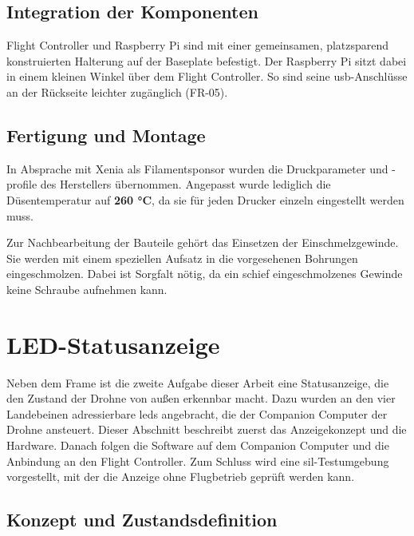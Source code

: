         \subsection{Integration der Komponenten}
        \label{sec:Frame_Integration}

        Flight Controller und Raspberry Pi sind mit einer gemeinsamen, platzsparend konstruierten Halterung auf der Baseplate befestigt. Der Raspberry Pi sitzt dabei in einem kleinen Winkel über dem Flight Controller. So sind seine \gls{usb}-Anschlüsse an der Rückseite leichter zugänglich (FR-05). %

        \subsection{Fertigung und Montage}
        \label{sec:Frame_Fertigung}

        In Absprache mit Xenia als Filamentsponsor wurden die Druckparameter und -profile des Herstellers übernommen. Angepasst wurde lediglich die Düsentemperatur auf \textbf{260 °C}, da sie für jeden Drucker einzeln eingestellt werden muss.

        Zur Nachbearbeitung der Bauteile gehört das Einsetzen der Einschmelzgewinde. Sie werden mit einem speziellen Aufsatz in die vorgesehenen Bohrungen eingeschmolzen. Dabei ist Sorgfalt nötig, da ein schief eingeschmolzenes Gewinde keine Schraube aufnehmen kann.

    \section{LED-Statusanzeige}
    \label{sec:LED}

    Neben dem Frame ist die zweite Aufgabe dieser Arbeit eine Statusanzeige, die den Zustand der Drohne von außen erkennbar macht. Dazu wurden an den vier Landebeinen adressierbare \glspl{led} angebracht, die der Companion Computer der Drohne ansteuert. Dieser Abschnitt beschreibt zuerst das Anzeigekonzept und die Hardware. Danach folgen die Software auf dem Companion Computer und die Anbindung an den Flight Controller. Zum Schluss wird eine \gls{sil}-Testumgebung vorgestellt, mit der die Anzeige ohne Flugbetrieb geprüft werden kann.

        \subsection{Konzept und Zustandsdefinition}
        \label{sec:LED_Konzept}

